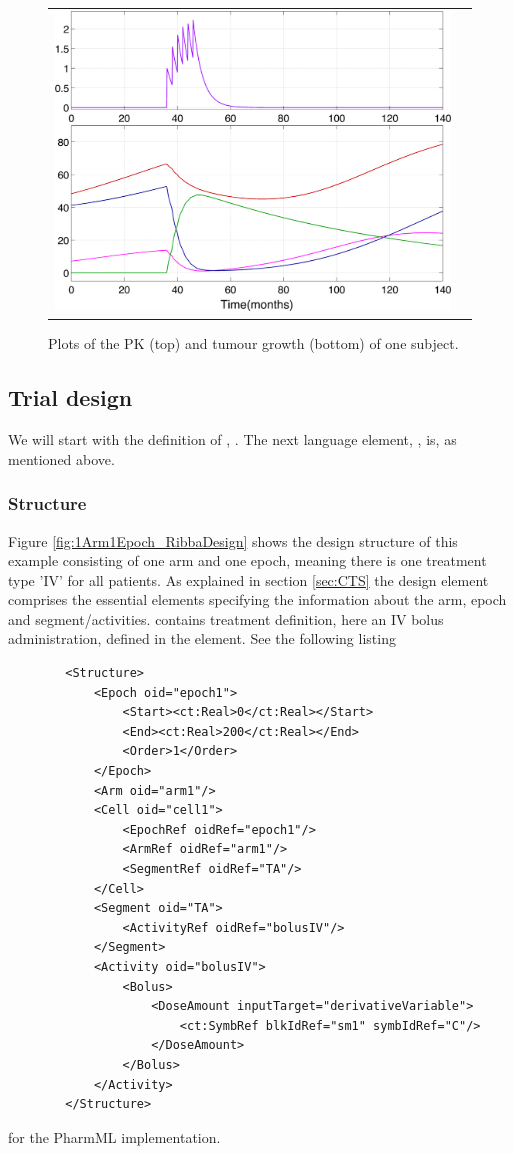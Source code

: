 \begin{figure}[htbp]
\centering
\begin{tabular}{cc}
\includegraphics[width=.5\textwidth]{pics/example5_timeCourse} 
\end{tabular}
\caption{Plots of the PK (top) and tumour growth (bottom) of one subject.}
\label{fig:oneSubjectPKandTumourGrowth}
\end{figure}

\subsection{Trial design}
We will start with the definition of , . The next language element, 
, is, as mentioned above.

\subsubsection{Structure}
Figure \ref{fig:1Arm1Epoch_RibbaDesign} shows the design structure of this example 
consisting of one arm and one epoch, meaning there is one treatment type 'IV' for all patients. 
As explained in section \ref{sec:CTS} the design element  comprises the 
essential elements specifying the information about the arm, epoch and segment/activities. 
 contains treatment definition, here an IV bolus administration, 
defined in the  element. 
See the following listing 
\lstset{language=XML}
\begin{lstlisting}
        <Structure>
            <Epoch oid="epoch1">
                <Start><ct:Real>0</ct:Real></Start>
                <End><ct:Real>200</ct:Real></End>
                <Order>1</Order>
            </Epoch>
            <Arm oid="arm1"/>
            <Cell oid="cell1">
                <EpochRef oidRef="epoch1"/>
                <ArmRef oidRef="arm1"/>
                <SegmentRef oidRef="TA"/>
            </Cell>
            <Segment oid="TA">
                <ActivityRef oidRef="bolusIV"/>
            </Segment>
            <Activity oid="bolusIV">
                <Bolus>
                    <DoseAmount inputTarget="derivativeVariable">
                        <ct:SymbRef blkIdRef="sm1" symbIdRef="C"/>
                    </DoseAmount>
                </Bolus>
            </Activity>
        </Structure> 
\end{lstlisting}
for the PharmML implementation.

